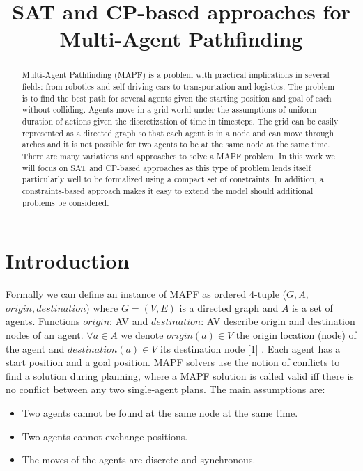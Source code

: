 \documentclass[12pt, a4paper, hidelinks]{article}
\begin{document}
\title{SAT and CP-based approaches for Multi-Agent Pathfinding}
\maketitle
\begin{abstract}
Multi-Agent Pathfinding (MAPF) is a problem with practical implications in several fields: from robotics and self-driving cars to transportation and logistics. The problem is to find the best path for several agents given the starting position and goal of each without colliding. Agents move in a grid world under the assumptions of uniform duration of actions given the discretization of time in timesteps. The grid can be easily represented as a directed graph so that each agent is in a node and can move through arches and it is not possible for two agents to be at the same node at the same time. There are many variations and approaches to solve a MAPF problem. In this work we will focus on SAT and CP-based approaches as this type of problem lends itself particularly well to be formalized using a compact set of constraints. In addition, a constraints-based approach makes it easy to extend the model should additional problems be considered.
\end{abstract}

\section{Introduction}
Formally we can define an instance of MAPF as ordered 4-tuple ($G, A,$ $origin, destination$) where $G = (V, E)$ is a directed graph and $A$ is a set of agents. Functions $origin$: A\textrightarrow V and $destination$: A\textrightarrow V describe origin and destination nodes of an agent. $\forall a\in A$ we denote $origin(a)\in V$ the origin location (node) of the agent and $destination(a)\in V$ its destination node  [1] . Each agent has a start position and a goal position. MAPF solvers use the notion of conflicts to find a solution during planning, where a MAPF solution is called valid iff there is no conflict between any two single-agent plans. The main assumptions are:

\begin{itemize} 
\item Two agents cannot be found at the same node at the same time.
\item Two agents cannot exchange positions.
\item The moves of the agents are discrete and synchronous.
\end{itemize}
\end{document}
